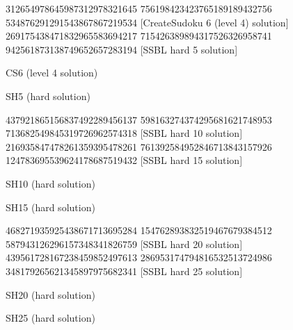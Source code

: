 \documentclass[twoside]{article}
\begin{document}
\renewcommand*{\puzzlefile}{cs6.ans}
\writepuzzle%
{312654978}{645987312}{978321645}%
{756198423}{423765189}{189432756}%
{534876291}{291543867}{867219534}%
[CreateSudoku 6 (level 4) solution]
\renewcommand*{\puzzlefile}{sh5.ans}
\writepuzzle%
{269175438}{471832965}{583694217}%
{715426389}{894317526}{326958741}%
{942561873}{138749652}{657283194}%
[SSBL hard 5 solution]
\vfill
\noindent\begin{minipage}{0.47\linewidth}\begin{center}
CS6 (level 4 solution) \\
\end{center}\end{minipage}
\hfill
\begin{minipage}{0.47\linewidth}\begin{center}
SH5 (hard solution) \\
\end{center}\end{minipage}

\renewcommand*{\puzzlefile}{sh10.ans}
\writepuzzle%
{437921865}{156837492}{289456137}%
{598163274}{374295681}{621748953}%
{713682549}{845319726}{962574318}%
[SSBL hard 10 solution]
\renewcommand*{\puzzlefile}{sh15.ans}
\writepuzzle%
{216935847}{478261359}{395478261}%
{761392584}{952846713}{843157926}%
{124783695}{539624178}{687519432}%
[SSBL hard 15 solution]
\vfill
\noindent\begin{minipage}{0.47\linewidth}\begin{center}
SH10 (hard solution) \\
\end{center}\end{minipage}
\hfill
\begin{minipage}{0.47\linewidth}\begin{center}
SH15 (hard solution) \\
\end{center}\end{minipage}

\renewcommand*{\puzzlefile}{sh20.ans}
\writepuzzle%
{468271935}{925438671}{713695284}%
{154762893}{832519467}{679384512}%
{587943126}{296157348}{341826759}%
[SSBL hard 20 solution]
\renewcommand*{\puzzlefile}{sh25.ans}
\writepuzzle%
{439561728}{167238459}{852497613}%
{286953174}{794816532}{513724986}%
{348179265}{621345897}{975682341}%
[SSBL hard 25 solution]
\vfill
\noindent\begin{minipage}{0.47\linewidth}\begin{center}
SH20 (hard solution) \\
\end{center}\end{minipage}
\hfill
\begin{minipage}{0.47\linewidth}\begin{center}
SH25 (hard solution) \\
\end{center}\end{minipage}
\end{document}
